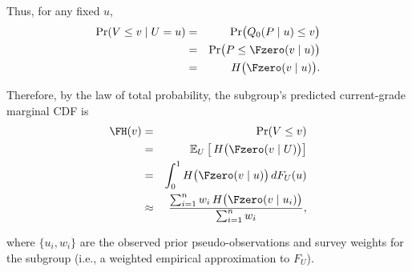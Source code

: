 \documentclass[10pt]{article}
\begin{document}
\begin{minipage}[t]{3.75in}
\begin{minipage}{3.45in}
    \vspace{4pt}
    Thus, for any fixed $u$,
    \begin{eqnarray*}
      \Pr(V\le v\mid U=u)
      &=& \Pr\bigl(Q_0(P\mid u)\le v\bigr) \\
      &=& \Pr\bigl(P\le \Fzero(v\mid u)\bigr) \\
      &=& H\bigl(\Fzero(v\mid u)\bigr).
    \end{eqnarray*}

    Therefore, by the law of total probability, the subgroup's predicted current-grade marginal CDF is
    \begin{eqnarray*}
      \FH(v)
      &=& \Pr(V\le v) \\
      &=& \mathbb{E}_{U}\left[\,H\bigl(\Fzero(v\mid U)\bigr)\right] \\
      &=& \int_0^1 H\bigl(\Fzero(v\mid u)\bigr)\,dF_U(u) \\
      &\approx& \frac{\sum_{i=1}^{n} w_i\,H\bigl(\Fzero(v\mid u_i)\bigr)}{\sum_{i=1}^{n} w_i},
    \end{eqnarray*}

    \vspace{1pt}
    where $\{u_i,w_i\}$ are the observed prior pseudo-observations and 
    survey weights for the subgroup (i.e., a weighted empirical approximation to $F_U$).

  \end{minipage}
  \vspace{0.1in}
\end{minipage}
\end{document}
